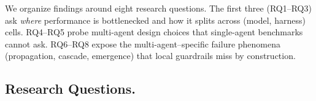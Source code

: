 \documentclass{article}
\begin{document}
\begin{table}
\vspace{-0.2cm}
\centering
\renewcommand{\arraystretch}{1.05}
\setlength{\tabcolsep}{2.2pt}
\caption{\fontsize{9.5pt}{10pt}\selectfont Layer-wise and overall safety scores under two settings. Numbers are placeholders.}
\vspace{-0.3cm}
\label{table:two_setting_results}
\end{table}


We organize findings around eight research questions. The first
three (RQ1--RQ3) ask \emph{where} performance is bottlenecked and
how it splits across (model, harness) cells. RQ4--RQ5 probe
multi-agent design choices that single-agent benchmarks cannot
ask. RQ6--RQ8 expose the multi-agent--specific failure phenomena
(propagation, cascade, emergence) that local guardrails miss by
construction.

\subsection{Research Questions.}
\end{document}
